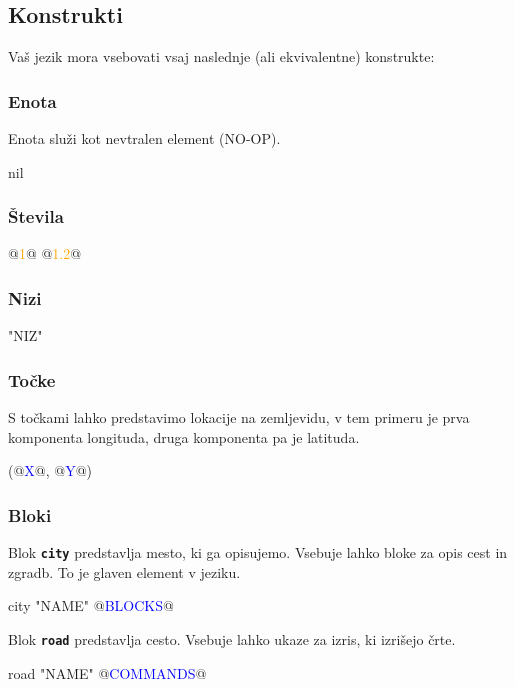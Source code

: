 \documentclass{article}
\newcommand\Var[1]{\textcolor{blue}{#1}}
\newcommand\Num[1]{\textcolor{orange}{#1}}
\newcommand\Keyword[1]{{\textbf{\texttt{#1}}}}
\begin{document}
\subsection{Konstrukti}
Vaš jezik mora vsebovati vsaj naslednje (ali ekvivalentne) konstrukte:

\subsubsection{Enota}
Enota služi kot nevtralen element (NO-OP).
\begin{CITY}
  nil
\end{CITY}

\subsubsection{Števila}
\begin{CITY}
  @\Num{1}@
  @\Num{1.2}@
\end{CITY}

\subsubsection{Nizi}
\begin{CITY}
  "NIZ"
\end{CITY}

\subsubsection{Točke}
S točkami lahko predstavimo lokacije na zemljevidu, v tem primeru je prva komponenta longituda, druga komponenta pa je latituda.
\begin{CITY}
  (@\Var{X}@, @\Var{Y}@)
\end{CITY}

\subsubsection{Bloki}
Blok \Keyword{city} predstavlja mesto, ki ga opisujemo.
Vsebuje lahko bloke za opis cest in zgradb.
To je glaven element v jeziku.
\begin{CITY}
  city "NAME" {
    @\Var{BLOCKS}@
  }
\end{CITY}

Blok \Keyword{road} predstavlja cesto.
Vsebuje lahko ukaze za izris, ki izrišejo črte.
\begin{CITY}
  road "NAME" {
    @\Var{COMMANDS}@
  }
\end{CITY}
\end{document}
